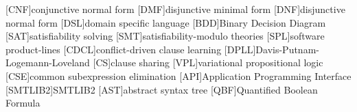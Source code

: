 \begin{acronym}[]
  [CNF]{conjunctive normal form}
  [DMF]{disjunctive minimal form}
  [DNF]{disjunctive normal form}
  [DSL]{domain specific language}
  [BDD]{Binary Decision Diagram}
  [SAT]{satisfiability solving}
  [SMT]{satisfiability-modulo theories}
  [SPL]{software product-lines}
  [CDCL]{conflict-driven clause learning}
  [DPLL]{Davis-Putnam-Logemann-Loveland}
  [CS]{clause sharing}
  [VPL]{variational propositional logic}
  [CSE]{common subexpression elimination}
  [API]{Application Programming Interface}
  [SMTLIB2]{SMTLIB2}
  [AST]{abstract syntax tree}
  [QBF]{Quantified Boolean Formula}
\end{acronym}